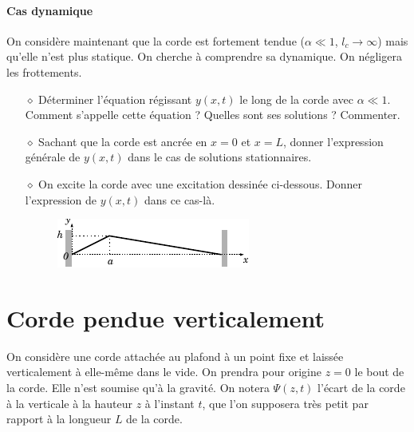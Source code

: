 \documentclass{report}
\begin{document}
\paragraph{Cas dynamique} On considère maintenant que la corde est fortement tendue ($\alpha\ll1$, $l_c\longrightarrow\infty$) mais qu'elle n'est plus statique. On cherche à comprendre sa dynamique. On négligera les frottements.

\begin{itemize}

	\item[$\diamond$] Déterminer l'équation régissant $y(x,t)$ le long de la corde avec $\alpha\ll1$. Comment s'appelle cette équation ? Quelles sont ses solutions ? Commenter.
	
	\item[$\diamond$] Sachant que la corde est ancrée en $x=0$ et $x=L$, donner l'expression générale de $y(x,t)$ dans le cas de solutions stationnaires. 
	
	\item[$\diamond$] On excite la corde avec une excitation dessinée ci-dessous. Donner l'expression de $y(x,t)$ dans ce cas-là.
	
	\begin{figure}[h!]
	\centering
		\includegraphics[scale=1.5]{onde2.pdf}
	\end{figure}

	
\end{itemize}

\newpage

\section*{Corde pendue verticalement}

On considère une corde attachée au plafond à un point fixe et laissée verticalement à elle-même dans le vide. On prendra pour origine $z=0$ le bout de la corde. Elle n'est soumise qu'à la gravité. On notera $\Psi(z,t)$ l'écart de la corde à la verticale à la hauteur $z$ à l'instant $t$, que l'on supposera très petit par rapport à la longueur $L$ de la corde.
\end{document}
